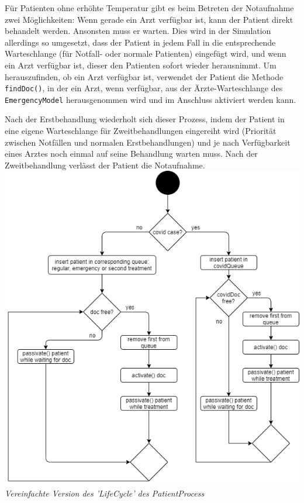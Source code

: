 \documentclass{article}
\begin{document}
Für Patienten ohne erhöhte Temperatur gibt es beim Betreten der Notaufnahme zwei Möglichkeiten:
Wenn gerade ein Arzt verfügbar ist, kann der Patient direkt behandelt werden.
Ansonsten muss er warten.
Dies wird in der Simulation allerdings so umgesetzt,
dass der Patient in jedem Fall in die entsprechende Warteschlange
(für Notfall- oder normale Patienten) eingefügt wird,
und wenn ein Arzt verfügbar ist, dieser den Patienten sofort wieder herausnimmt.
Um herauszufinden, ob ein Arzt verfügbar ist, verwendet der Patient die Methode \texttt{findDoc()},
in der ein Arzt, wenn verfügbar,
aus der Ärzte-Warteschlange des \texttt{EmergencyModel} herausgenommen wird und im Anschluss aktiviert werden kann.

Nach der Erstbehandlung wiederholt sich dieser Prozess, indem der Patient in eine eigene Warteschlange für Zweitbehandlungen eingereiht wird (Priorität zwischen Notfällen und normalen Erstbehandlungen) und je nach Verfügbarkeit eines Arztes noch einmal auf seine Behandlung warten muss. Nach der Zweitbehandlung verlässt der Patient die Notaufnahme.\\

\includegraphics[width=\textwidth]{img/patientProcess.png}
\textit{Vereinfachte Version des 'LifeCycle' des PatientProcess}
\end{document}
